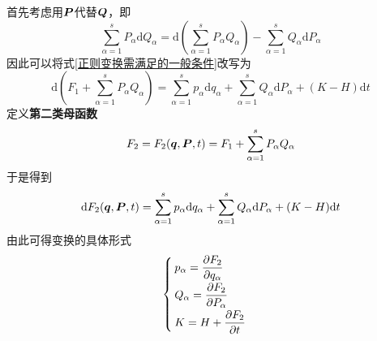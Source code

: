 首先考虑用$\boldsymbol{P}$代替$\boldsymbol{Q}$，即
\begin{equation*}
	\sum_{\alpha=1}^s P_\alpha \mathrm{d} Q_\alpha = \mathrm{d} \left(\sum_{\alpha=1}^s P_\alpha Q_\alpha\right) - \sum_{\alpha=1}^s Q_\alpha \mathrm{d} P_\alpha
\end{equation*}
因此可以将式\eqref{正则变换需满足的一般条件}改写为
\begin{equation*}
	\mathrm{d} \left(F_1 + \sum_{\alpha=1}^s P_\alpha Q_\alpha\right) = \sum_{\alpha=1}^s p_\alpha \mathrm{d} q_\alpha + \sum_{\alpha=1}^s Q_\alpha \mathrm{d} P_\alpha + (K-H) \mathrm{d} t
\end{equation*}
定义{\bf 第二类母函数}
\begin{equation}
	F_2 = F_2(\boldsymbol{q},\boldsymbol{P},t) = F_1 + \sum_{\alpha=1}^s P_\alpha Q_\alpha
	\label{第二类母函数}
\end{equation}
于是得到
\begin{equation}
	\mathrm{d} F_2(\boldsymbol{q},\boldsymbol{P},t) = \sum_{\alpha=1}^s p_\alpha \mathrm{d} q_\alpha + \sum_{\alpha=1}^s Q_\alpha \mathrm{d} P_\alpha + (K-H) \mathrm{d} t
	\label{第二类母函数下的正则变换}
\end{equation}
由此可得变换的具体形式
\begin{equation}
	\begin{cases}
		\displaystyle p_\alpha = \frac{\partial F_2}{\partial q_\alpha} \\[1.5ex]
		\displaystyle Q_\alpha = \frac{\partial F_2}{\partial P_\alpha} \\[1.5ex]
		\displaystyle K = H + \frac{\partial F_2}{\partial t}
	\end{cases}
	\label{chapter10:第二类母函数下的正则变换-变换式}
\end{equation}


